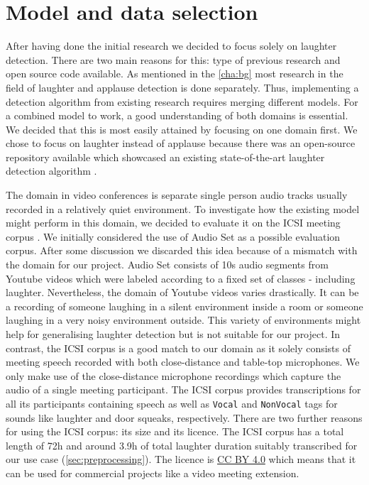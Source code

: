 \documentclass[bsc,frontabs,parskip,deptreport]{infthesis}
\begin{document}
\section{Model and data selection}\label{sec:model-and-data}
After having done the initial research we decided to focus solely on laughter detection. 
There are two main reasons for this: type of previous research and open source code available.  
As mentioned in the \autoref{cha:bg} most research in the field of laughter and applause detection is done separately. 
Thus, implementing a detection algorithm from existing research requires merging different models. 
For a combined model to work, a good understanding of both domains is essential.
We decided that this is most easily attained by focusing on one domain first. 
We chose to focus on laughter instead of applause because there was an open-source repository available which showcased an existing state-of-the-art laughter detection algorithm \citep{gillick-codebase}.

The domain in video conferences is separate single person audio tracks usually recorded in a relatively quiet environment.
To investigate how the existing model might perform in this domain, we decided to evaluate it on the ICSI meeting corpus \citep{morgan2001meeting}. 
We initially considered the use of Audio Set \citep{googleaudioset} as a possible evaluation corpus. After some discussion we discarded this idea because of a mismatch with the domain for our project. Audio Set  consists of 10s audio segments from Youtube videos which were labeled according to a fixed set of classes - including laughter. Nevertheless, the domain of Youtube videos varies drastically. It can be a recording of someone laughing in a silent environment inside a room or someone laughing in a very noisy environment outside. This variety of environments might help for generalising laughter detection but is not suitable for our project.
In contrast, the ICSI corpus is a good match to our domain as it solely consists of meeting speech recorded with both close-distance and table-top microphones. 
We only make use of the close-distance microphone recordings which capture the audio of a single meeting participant.
The ICSI corpus provides transcriptions for all its participants containing speech as well as \texttt{Vocal} and \texttt{NonVocal} tags for sounds like laughter and door squeaks, respectively.
There are two further reasons for using the ICSI corpus: its size and its licence.
The ICSI corpus has a total length of 72h and around 3.9h of total laughter duration suitably transcribed for our use case (\autoref{sec:preprocessing}).
The licence is \href{https://creativecommons.org/licenses/by/4.0/legalcode}{CC BY 4.0} which means that it can be used for commercial projects like a video meeting extension.
\end{document}
